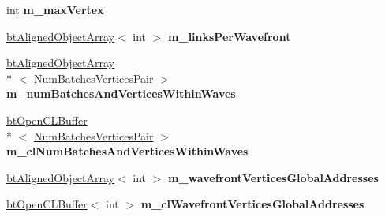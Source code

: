 \begin{DoxyCompactItemize}
\item 
\hypertarget{classbt_soft_body_link_data_open_c_l_s_i_m_d_aware_a9e78ed7667d9cf432d9e1ff216f6dcd1}{int {\bfseries m\+\_\+max\+Vertex}}\label{classbt_soft_body_link_data_open_c_l_s_i_m_d_aware_a9e78ed7667d9cf432d9e1ff216f6dcd1}

\item 
\hypertarget{classbt_soft_body_link_data_open_c_l_s_i_m_d_aware_af47623c7e3ef716f29a1fc9a24a0592f}{\hyperlink{classbt_aligned_object_array}{bt\+Aligned\+Object\+Array}$<$ int $>$ {\bfseries m\+\_\+links\+Per\+Wavefront}}\label{classbt_soft_body_link_data_open_c_l_s_i_m_d_aware_af47623c7e3ef716f29a1fc9a24a0592f}

\item 
\hypertarget{classbt_soft_body_link_data_open_c_l_s_i_m_d_aware_a4b25bc51fd0592aea9e2cf6e64345607}{\hyperlink{classbt_aligned_object_array}{bt\+Aligned\+Object\+Array}\\*
$<$ \hyperlink{structbt_soft_body_link_data_open_c_l_s_i_m_d_aware_1_1_num_batches_vertices_pair}{Num\+Batches\+Vertices\+Pair} $>$ {\bfseries m\+\_\+num\+Batches\+And\+Vertices\+Within\+Waves}}\label{classbt_soft_body_link_data_open_c_l_s_i_m_d_aware_a4b25bc51fd0592aea9e2cf6e64345607}

\item 
\hypertarget{classbt_soft_body_link_data_open_c_l_s_i_m_d_aware_a9e28eaf45a112c30896896c409177d6d}{\hyperlink{classbt_open_c_l_buffer}{bt\+Open\+C\+L\+Buffer}\\*
$<$ \hyperlink{structbt_soft_body_link_data_open_c_l_s_i_m_d_aware_1_1_num_batches_vertices_pair}{Num\+Batches\+Vertices\+Pair} $>$ {\bfseries m\+\_\+cl\+Num\+Batches\+And\+Vertices\+Within\+Waves}}\label{classbt_soft_body_link_data_open_c_l_s_i_m_d_aware_a9e28eaf45a112c30896896c409177d6d}

\item 
\hypertarget{classbt_soft_body_link_data_open_c_l_s_i_m_d_aware_abb837d480b19c6af1a42494054f70820}{\hyperlink{classbt_aligned_object_array}{bt\+Aligned\+Object\+Array}$<$ int $>$ {\bfseries m\+\_\+wavefront\+Vertices\+Global\+Addresses}}\label{classbt_soft_body_link_data_open_c_l_s_i_m_d_aware_abb837d480b19c6af1a42494054f70820}

\item 
\hypertarget{classbt_soft_body_link_data_open_c_l_s_i_m_d_aware_a1bac9a97368ab5b01e1509f112cf8067}{\hyperlink{classbt_open_c_l_buffer}{bt\+Open\+C\+L\+Buffer}$<$ int $>$ {\bfseries m\+\_\+cl\+Wavefront\+Vertices\+Global\+Addresses}}\label{classbt_soft_body_link_data_open_c_l_s_i_m_d_aware_a1bac9a97368ab5b01e1509f112cf8067}


\end{DoxyCompactItemize}
